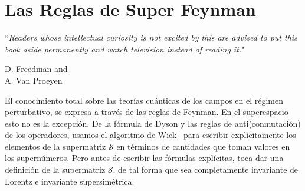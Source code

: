 \chapter{Las Reglas de Super Feynman}

\epigraph{``\textit{Readers whose intellectual curiosity is not excited by this are advised to put this book aside permanently  and watch television instead of reading it.}"}{D. Freedman and\\ A. Van Proeyen~\cite{freedman2012supergravity}}
\label{chap:6}
El conocimiento total  sobre las teorías cuánticas de los campos en el régimen  perturbativo, se expresa a través de las reglas de Feynman. En el superespacio esto no es la excepción. De la fórmula de Dyson  y las reglas de anti(conmutación) de los operadores, usamos el algoritmo de Wick~\cite{Wick:1950ee} para escribir  explícitamente los elementos de la supermatriz $ \mathcal{S} $ en términos de cantidades que toman valores en los supernúmeros. Pero antes de escribir las fórmulas explícitas, toca  dar una definición de la supermatriz $ \mathcal{S} $, de tal forma que sea completamente invariante de Lorentz e invariante supersimétrica.

